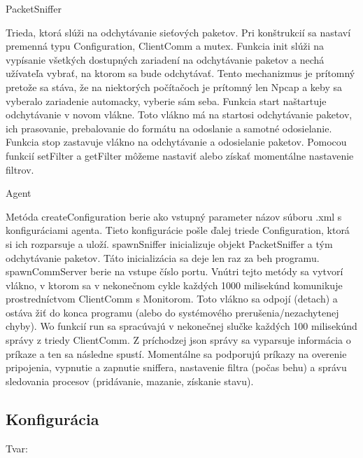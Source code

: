 \documentclass[a4paper,12pt]{article}
\begin{document}
PacketSniffer

Trieda, ktorá slúži na odchytávanie sieťových paketov. Pri konštrukcií sa nastaví premenná typu Configuration, ClientComm a mutex. Funkcia init slúži na vypísanie všetkých dostupných zariadení na odchytávanie paketov a nechá užívateľa vybrať, na ktorom sa bude odchytávať. Tento mechanizmus je prítomný pretože sa stáva, že na niektorých počítačoch je prítomný len Npcap a keby sa vyberalo zariadenie automacky, vyberie sám seba. Funkcia start naštartuje odchytávanie v novom vlákne. Toto vlákno má na startosi odchytávanie paketov, ich prasovanie, prebalovanie do formátu na odoslanie a samotné odosielanie. Funkcia stop zastavuje vlákno na odchytávanie a odosielanie paketov. Pomocou funkcií setFilter a getFilter môžeme nastaviť alebo získať momentálne nastavenie filtrov. 

Agent

Metóda createConfiguration berie ako vstupný parameter názov súboru .xml s konfiguráciami agenta. Tieto konfigurácie pošle ďalej triede Configuration, ktorá si ich rozparsuje a uloží. spawnSniffer inicializuje objekt PacketSniffer a tým odchytávanie paketov. Táto inicializácia sa deje len raz za beh programu. spawnCommServer berie na vstupe číslo portu. Vnútri tejto metódy sa vytvorí vlákno, v ktorom sa v nekonečnom cykle každých 1000 milisekúnd komunikuje prostredníctvom ClientComm s Monitorom. Toto vlákno sa odpojí (detach) a ostáva žiť do konca programu (alebo do systémového prerušenia/nezachytenej chyby). Wo funkcií run sa spracúvajú v nekonečnej slučke každých 100 milisekúnd správy z triedy ClientComm. Z príchodzej json správy sa vyparsuje informácia o príkaze a ten sa následne spustí. Momentálne sa podporujú príkazy na overenie pripojenia, vypnutie a zapnutie sniffera, nastavenie filtra (počas behu) a správu sledovania procesov (pridávanie, mazanie, získanie stavu).

\subsection{Konfigurácia}

Tvar: \\ \\
\end{document}
